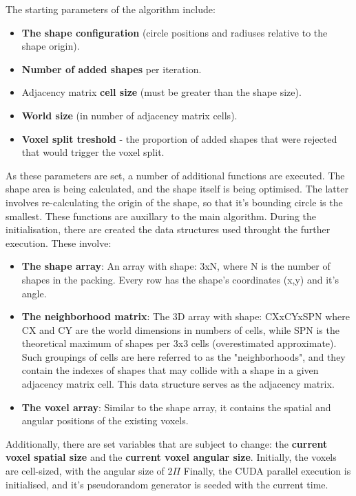 \documentclass[12pt, oneside]{report}
\begin{document}
The starting parameters of the algorithm include:
\begin{itemize}
  \item \textbf{The shape configuration} (circle positions and radiuses relative to the shape origin).
  \item \textbf{Number of added shapes} per iteration.
  \item Adjacency matrix \textbf{cell size} (must be greater than the shape size).
  \item \textbf{World size} (in number of adjacency matrix cells).
	\item \textbf{Voxel split treshold} - the proportion of added shapes that were rejected that would trigger the voxel split.
\end{itemize}
As these parameters are set, a number of additional functions are executed. The shape area is being calculated, and the shape itself is being optimised. The latter involves re-calculating the origin of the shape, so that it's bounding circle is the smallest. These functions are auxillary to the main algorithm.
\newline
During the initialisation, there are created the data structures used throught the further execution. These involve:
\begin{itemize}
  \item \textbf{The shape array}: An array with shape: 3xN, where N is the number of shapes in the packing. Every row has the shape's coordinates (x,y) and it's angle.
  \item \textbf{The neighborhood matrix}: The 3D array with shape: CXxCYxSPN where CX and CY are the world dimensions in numbers of cells, while SPN is the theoretical maximum of shapes per 3x3 cells (overestimated approximate). Such groupings of cells are here referred to as the "neighborhoods", and they contain the indexes of shapes that may collide with a shape in a given adjacency matrix cell. This data structure serves as the adjacency matrix.
  \item \textbf{The voxel array}: Similar to the shape array, it contains the spatial and angular positions of the existing voxels.
\end{itemize}
Additionally, there are set variables that are subject to change: the \textbf{current voxel spatial size} and the \textbf{current voxel angular size}. Initially, the voxels are cell-sized, with the angular size of $2 \Pi$
Finally, the CUDA parallel execution is initialised, and it's pseudorandom generator is seeded with the current time.
\end{document}
